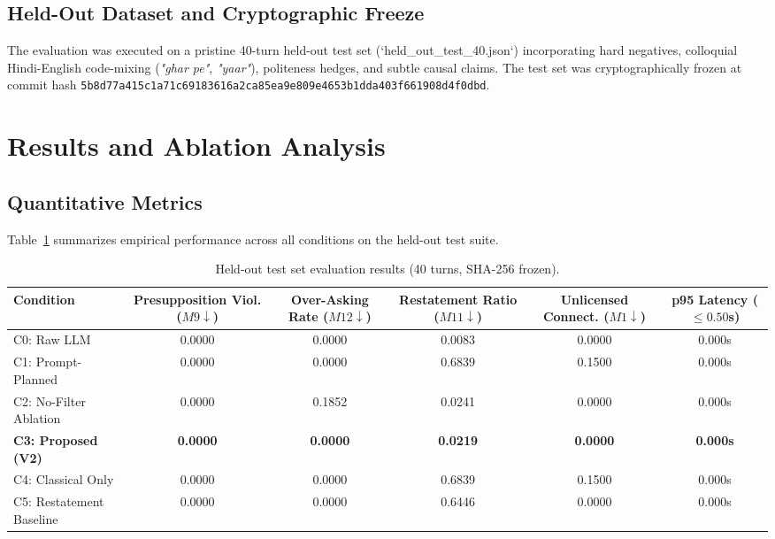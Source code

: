 \documentclass[11pt,a4paper]{article}
\begin{document}
\subsection{Held-Out Dataset and Cryptographic Freeze}
The evaluation was executed on a pristine 40-turn held-out test set (`held\_out\_test\_40.json`) incorporating hard negatives, colloquial Hindi-English code-mixing (\emph{"ghar pe"}, \emph{"yaar"}), politeness hedges, and subtle causal claims. The test set was cryptographically frozen at commit hash \texttt{5b8d77a415c1a71c69183616a2ca85ea9e809e4653b1dda403f661908d4f0dbd}.

\section{Results and Ablation Analysis}

\subsection{Quantitative Metrics}
Table~\ref{tab:evaluation_results} summarizes empirical performance across all conditions on the held-out test suite.

\begin{table}[htbp]
\centering
\small
\caption{Held-out test set evaluation results (40 turns, SHA-256 frozen).}
\label{tab:evaluation_results}
\begin{tabular}{lccccc}
\toprule
\textbf{Condition} & \textbf{Presupposition Viol.} ($M9 \downarrow$) & \textbf{Over-Asking Rate} ($M12 \downarrow$) & \textbf{Restatement Ratio} ($M11 \downarrow$) & \textbf{Unlicensed Connect.} ($M1 \downarrow$) & \textbf{p95 Latency} ($\le 0.50$s) \\
\midrule
C0: Raw LLM & 0.0000 & 0.0000 & 0.0083 & 0.0000 & 0.000s \\
C1: Prompt-Planned & 0.0000 & 0.0000 & 0.6839 & 0.1500 & 0.000s \\
C2: No-Filter Ablation & 0.0000 & 0.1852 & 0.0241 & 0.0000 & 0.000s \\
\textbf{C3: Proposed (V2)} & \textbf{0.0000} & \textbf{0.0000} & \textbf{0.0219} & \textbf{0.0000} & \textbf{0.000s} \\
C4: Classical Only & 0.0000 & 0.0000 & 0.6839 & 0.1500 & 0.000s \\
C5: Restatement Baseline & 0.0000 & 0.0000 & 0.6446 & 0.0000 & 0.000s \\
\bottomrule
\end{tabular}
\end{table}
\end{document}
